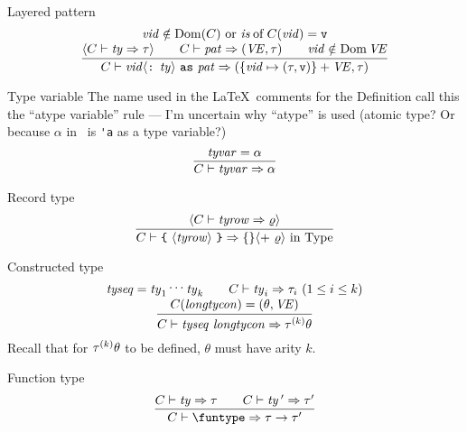 \begin{sml-rule}{Layered pattern}
\begin{equation}\label{rule:static-core:layered-pattern}
  \vcenter{\infer{\C\ts\layeredvidpat\ra(\plusmap{\{\vid\mapsto(\tau,\isv)\}}{\VE},\tau)}
    {\deduce{\optional{\C\ts\ty\ra\tau}
        \qquad \C\ts\pat\ra(\VE,\tau)
      \qquad \vid\notin\Dom\VE
      }
      {\vid\notin\Dom(\C)\mbox{ or }\of{\is}{C(\vid)} = \isv}}}
\end{equation}
\end{sml-rule}


\begin{sml-rule}{Type variable}
The name used in the \LaTeX\ comments for the Definition call this
the ``atype variable'' rule --- I'm uncertain why ``atype'' is used
(atomic type? Or because $\alpha$ in \SML\ is \verb|'a| as a type variable?)
\begin{equation}\label{rule:static-core:type-variable}
  \vcenter{\infer{\C\ts\tyvar\ra\alpha}
    {\tyvar=\alpha}}
\end{equation}
\end{sml-rule}

\begin{sml-rule}{Record type}
\begin{equation}\label{rule:static-core:record-type}
  \vcenter{\infer{\C\ts\lttbrace\ \rectype\ \rttbrace\ra\emptymap\optional{ +\ \varrho}\ \In\ \Type}
    {\optional{\C\ts\labtys\ra\varrho}}}
\end{equation}
\end{sml-rule}

\begin{sml-rule}{Constructed type}
\begin{equation}\label{rule:static-core:constructed-type}
  \vcenter{\infer{\C\ts\constype\ra\tauk\theta}
    {\deduce{\C(\longtycon)=(\theta,\VE)}
      {\tyseq=\ty_{1}\syndots\ty_{k}\qquad\C\ts\ty_{i}\ra\tau_{i}\ (1\leq i\leq k)}}}
\end{equation}
Recall that for $\mbox{$\tau^{(k)}$}\theta$ to be defined, $\theta$ must have arity
$k$.
\end{sml-rule}

\begin{sml-rule}{Function type}
\begin{equation}\label{rule:static-core:function-type}
  \vcenter{\infer{\C\ts\funtype\ra\tau\to\tau'}
    {\C\ts\ty\ra\tau\qquad\C\ts\ty\,'\ra\tau'}}
\end{equation}
\end{sml-rule}

